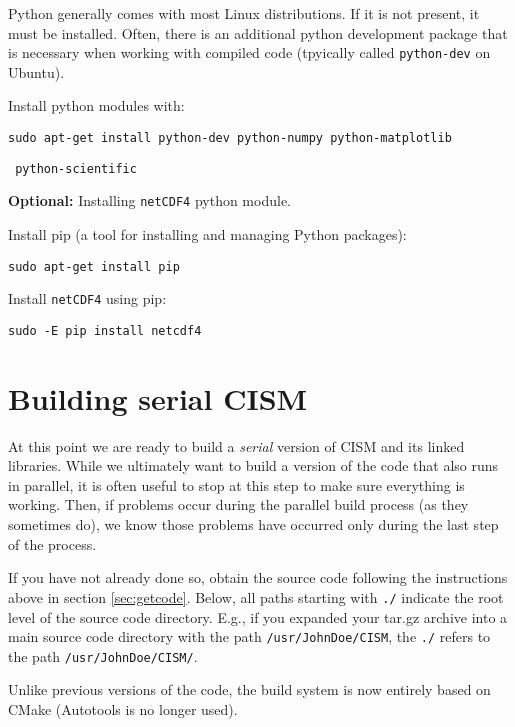 \begin{mdframed}[style=ubuntu] %
Python generally comes with most Linux distributions.  If it is not present, it must be installed.
Often, there is an additional python development package that is necessary
when working with compiled code (tpyically called \texttt{python-dev} on Ubuntu).

Install python modules with:

\texttt{sudo apt-get install python-dev python-numpy python-matplotlib} 

\texttt{          python-scientific}

\textbf{Optional:} Installing \texttt{netCDF4} python module.

\noindent
Install pip (a tool for installing and managing Python packages):

\texttt{sudo apt-get install pip}

\noindent
Install \texttt{netCDF4} using pip:

\texttt{sudo -E pip install netcdf4}
\end{mdframed}                 %



\section{Building serial CISM}
\label{serial-build}
At this point we are ready to build a \textit{serial} version of CISM and its linked libraries. While we ultimately want to build a 
version of the code that also runs in parallel, it is often useful to stop at this step to make sure everything is working. Then, if 
problems occur during the parallel build process (as they sometimes do), we know those problems have occurred only during 
the last step of the process.

If you have not already done so, obtain the source code following the instructions above in section \ref{sec:getcode}. Below, all 
paths starting with \texttt{./} indicate the root level of the source code directory. E.g., if you expanded your tar.gz archive into a main source code 
directory with the path \texttt{/usr/JohnDoe/CISM}, the \texttt{./} refers to the path \texttt{/usr/JohnDoe/CISM/}.  

Unlike previous versions of the code, the build system is now entirely based on CMake 
(Autotools is no longer used). 

